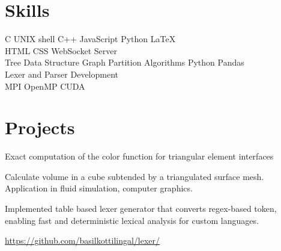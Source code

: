 \documentclass[]{deedy-resume-openfont}
\begin{document}
\begin{minipage}[t]{0.49\textwidth} 


\section{Skills}

\begin{flushleft}
 C \textbullet{} UNIX shell \textbullet{} C++ \textbullet{} JavaScript \textbullet{} Python \textbullet{} \LaTeX
\\
 HTML \textbullet{} CSS \textbullet{} WebSocket Server
\\
 Tree Data Structure \textbullet{} Graph Partition Algorithms \textbullet{} Python Pandas
\\
 Lexer and Parser  Development
\\
 MPI \textbullet{} OpenMP \textbullet{} CUDA
\end{flushleft}


\section{Projects}


%
%

\begin{tightemize}
\item Exact computation of the color function for triangular element interfaces
\item Calculate volume in a cube subtended by a triangulated surface mesh. Application in fluid simulation, computer graphics.
\end{tightemize}

\begin{tightemize}
\item Implemented table based lexer generator that converts regex-based token, enabling fast and deterministic lexical analysis for custom languages.
\item \href{https://github.com/basilkottilingal/lexer/}{https://github.com/basilkottilingal/lexer/}
\end{tightemize}


\end{minipage}
\end{document}
